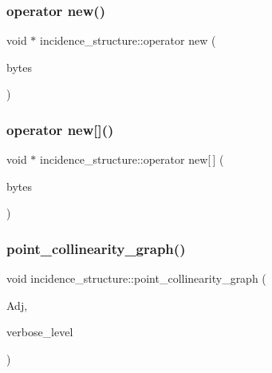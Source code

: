 \mbox{\label{classincidence__structure_a4d04490ec682cc5901a5c84b3817eca1}} 
\subsubsection{\texorpdfstring{operator new()}{operator new()}}
{\footnotesize\ttfamily void $\ast$ incidence\+\_\+structure\+::operator new (\begin{DoxyParamCaption}\item[{size\+\_\+t}]{bytes }\end{DoxyParamCaption})}

\mbox{\label{classincidence__structure_a010dc7086fd5a2500027afccae20916d}} 
\subsubsection{\texorpdfstring{operator new[]()}{operator new[]()}}
{\footnotesize\ttfamily void $\ast$ incidence\+\_\+structure\+::operator new\mbox{[}$\,$\mbox{]} (\begin{DoxyParamCaption}\item[{size\+\_\+t}]{bytes }\end{DoxyParamCaption})}

\mbox{\label{classincidence__structure_a86b9bdb4481941c837f9cf21da0f7a90}} 
\subsubsection{\texorpdfstring{point\+\_\+collinearity\+\_\+graph()}{point\_collinearity\_graph()}}
{\footnotesize\ttfamily void incidence\+\_\+structure\+::point\+\_\+collinearity\+\_\+graph (\begin{DoxyParamCaption}\item[{\mbox{\hyperlink{galois_8h_a09fddde158a3a20bd2dcadb609de11dc}{I\+NT}} $\ast$}]{Adj,  }\item[{\mbox{\hyperlink{galois_8h_a09fddde158a3a20bd2dcadb609de11dc}{I\+NT}}}]{verbose\+\_\+level }\end{DoxyParamCaption})}

